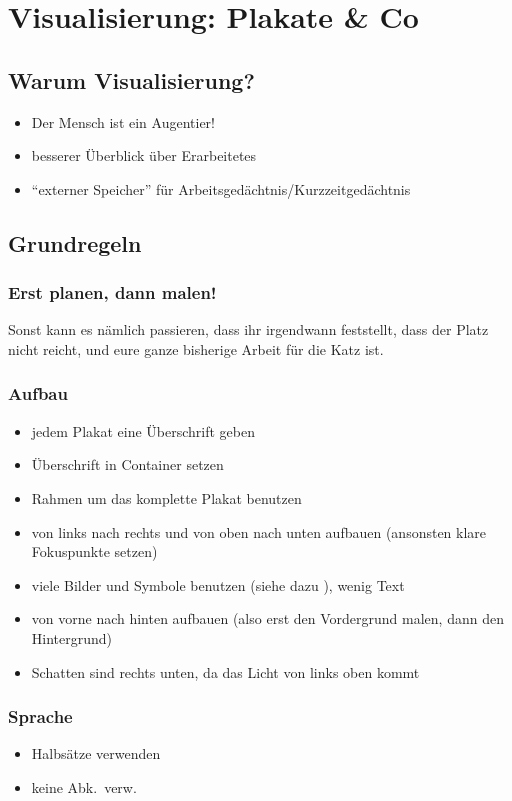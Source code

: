 \section{Visualisierung: Plakate \& Co}
\label{visualisierung}

\subsection{Warum Visualisierung?}
\begin{itemize}
  \item Der Mensch ist ein Augentier!
  \item besserer Überblick über Erarbeitetes
  \item "`externer Speicher"' für Arbeitsgedächtnis/Kurzzeitgedächtnis
\end{itemize}

\subsection{Grundregeln}

\subsubsection{Erst planen, dann malen!}
Sonst kann es nämlich passieren, dass ihr irgendwann feststellt, dass der Platz nicht reicht, und eure ganze bisherige Arbeit für die Katz ist.

\subsubsection{Aufbau}
\begin{itemize}
  \item jedem Plakat eine Überschrift geben
  \item Überschrift in Container setzen
  \item Rahmen um das komplette Plakat benutzen
  \item von links nach rechts und von oben nach unten aufbauen (ansonsten klare Fokuspunkte setzen)
  \item viele Bilder und Symbole benutzen (siehe dazu \cite{bikablo}), wenig Text
  \item von vorne nach hinten aufbauen (also erst den Vordergrund malen, dann den Hintergrund)
  \item Schatten sind rechts unten, da das Licht von links oben kommt
\end{itemize}

\subsubsection{Sprache}
\begin{itemize}
  \item Halbsätze verwenden
  \item keine Abk.~verw.
\end{itemize}

